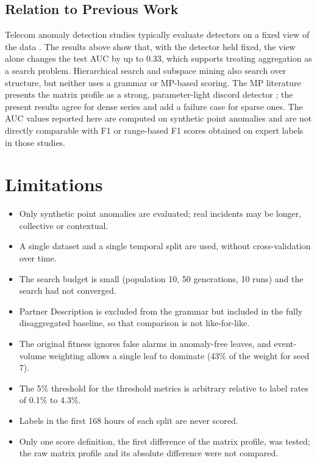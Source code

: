 \subsection{Relation to Previous Work}

Telecom anomaly detection studies typically evaluate detectors on a fixed view of the data \parencite{gonzalez2024one, mefleh2025beyond, burgueno2020online}.
The results above show that, with the detector held fixed, the view alone changes the test \ac{AUC} by up to 0.33, which supports treating aggregation as a search problem.
Hierarchical search \parencite{wolff2022composite} and subspace mining \parencite{he2021mining} also search over structure, but neither uses a grammar or \ac{MP}-based scoring.
The \ac{MP} literature presents the matrix profile as a strong, parameter-light discord detector \parencite{yeh2017timeseriesjoins}; the present results agree for dense series and add a failure case for sparse ones.
The \ac{AUC} values reported here are computed on synthetic point anomalies and are not directly comparable with F1 or range-based F1 scores obtained on expert labels in those studies.

\section{Limitations}
\label{sec:limitations}

\begin{itemize}
    \item Only synthetic point anomalies are evaluated; real incidents may be longer, collective or contextual.
    \item A single dataset and a single temporal split are used, without cross-validation over time.
    \item The search budget is small (population 10, 50 generations, 10 runs) and the search had not converged.
    \item Partner Description is excluded from the grammar but included in the fully disaggregated baseline, so that comparison is not like-for-like.
    \item The original fitness ignores false alarms in anomaly-free leaves, and event-volume weighting allows a single leaf to dominate (43\% of the weight for seed 7).
    \item The 5\% threshold for the threshold metrics is arbitrary relative to label rates of 0.1\% to 4.3\%.
    \item Labels in the first 168 hours of each split are never scored.
    \item Only one score definition, the first difference of the matrix profile, was tested; the raw matrix profile and its absolute difference were not compared.
\end{itemize}
